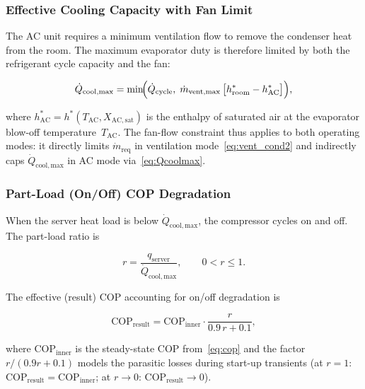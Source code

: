 \documentclass[12pt, a4paper]{article}
\newcommand{\mdot}{\dot{m}}
\newcommand{\Qdot}{\dot{Q}}
\newcommand{\hstar}{h^{*}}
\newcommand{\TAC}{T_{\mathrm{AC}}}
\begin{document}
\subsubsection{Effective Cooling Capacity with Fan Limit}

The AC unit requires a minimum ventilation flow to remove the condenser heat from the
room.
The maximum evaporator duty is therefore limited by both the refrigerant cycle capacity
and the fan:

\begin{equation}
  \Qdot_{\mathrm{cool,max}}
  = \min\!\Bigl(
      \Qdot_{\mathrm{cycle}},\;
      \mdot_{\mathrm{vent,max}}\,
      \bigl[\hstar_{\mathrm{room}} - \hstar_{\mathrm{AC}}\bigr]
    \Bigr),
  \label{eq:Qcoolmax}
\end{equation}

where $\hstar_{\mathrm{AC}} = \hstar(\TAC, X_{\mathrm{AC,sat}})$ is the enthalpy of
saturated air at the evaporator blow-off temperature~$\TAC$.
The fan-flow constraint thus applies to both operating modes: it directly limits
$\mdot_{\mathrm{req}}$ in ventilation mode~\eqref{eq:vent_cond2} and indirectly caps
$\Qdot_{\mathrm{cool,max}}$ in AC mode via~\eqref{eq:Qcoolmax}.

\subsubsection{Part-Load (On/Off) COP Degradation}

When the server heat load is below $\Qdot_{\mathrm{cool,max}}$, the compressor cycles
on and off.
The part-load ratio is

\begin{equation}
  r = \frac{q_{\mathrm{server}}}{\Qdot_{\mathrm{cool,max}}}, \qquad 0 < r \leq 1.
  \label{eq:plr}
\end{equation}

The effective (result) COP accounting for on/off degradation is

\begin{equation}
  \mathrm{COP}_{\mathrm{result}}
  = \mathrm{COP}_{\mathrm{inner}} \cdot \frac{r}{0.9\,r + 0.1},
  \label{eq:cop_degradation}
\end{equation}

where $\mathrm{COP}_{\mathrm{inner}}$ is the steady-state COP from~\eqref{eq:cop}
and the factor $r/(0.9r+0.1)$ models the parasitic losses during start-up transients
(at $r=1$: $\mathrm{COP}_{\mathrm{result}} = \mathrm{COP}_{\mathrm{inner}}$;
at $r \to 0$: $\mathrm{COP}_{\mathrm{result}} \to 0$).
\end{document}
